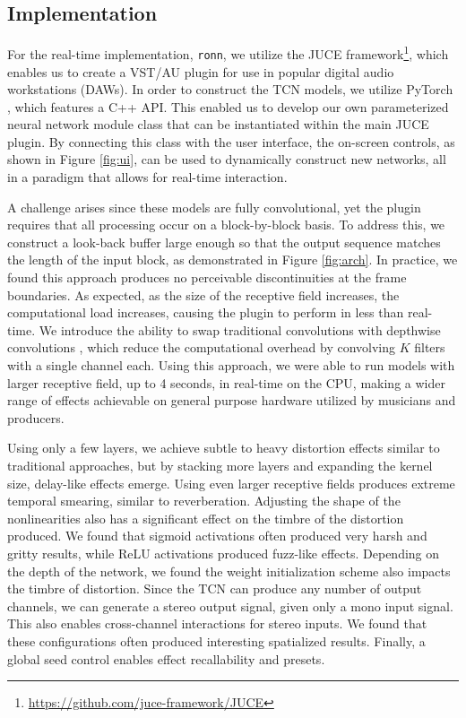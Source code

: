 \documentclass{article}
\begin{document}
\subsection{Implementation}
For the real-time implementation, \texttt{ronn}, we utilize the JUCE framework\footnote{\url{https://github.com/juce-framework/JUCE}},
which enables us to create a VST/AU plugin for use in popular digital audio workstations (DAWs).
In order to construct the TCN models, we utilize PyTorch \cite{pytorch}, which features a C++ API. 
This enabled us to develop our own parameterized neural network module class that can be instantiated within the main JUCE plugin.
By connecting this class with the user interface, the on-screen controls, as shown in Figure \ref{fig:ui},
can be used to dynamically construct new networks, all in a paradigm that allows for real-time interaction. 

A challenge arises since these models are fully convolutional,
yet the plugin requires that all processing occur on a block-by-block basis. 
To address this, we construct a look-back buffer large enough so that the output sequence matches the length of the input block, 
as demonstrated in Figure \ref{fig:arch}. 
In practice, we found this approach produces no perceivable discontinuities at the frame boundaries. 
As expected, as the size of the receptive field increases, the computational load increases, causing the plugin to perform in less than real-time.
We introduce the ability to swap traditional convolutions with depthwise convolutions \cite{howard2017mobilenets},
which reduce the computational overhead by convolving $K$ filters with a single channel each. 
Using this approach, we were able to run models with larger receptive field, up to 4 seconds, in real-time on the CPU,
making a wider range of effects achievable on general purpose hardware utilized by musicians and producers. 

Using only a few layers, we achieve subtle to heavy distortion effects similar to traditional approaches, 
but by stacking more layers and expanding the kernel size, delay-like effects emerge. 
Using even larger receptive fields produces extreme temporal smearing, similar to reverberation.
Adjusting the shape of the nonlinearities also has a significant effect on the timbre of the distortion produced. 
We found that sigmoid activations often produced very harsh and gritty results, while ReLU activations \cite{nair2010rectified} produced fuzz-like effects.
Depending on the depth of the network, we found the weight initialization scheme also impacts the timbre of distortion. 
Since the TCN can produce any number of output channels, we can generate a stereo output signal, given only a mono input signal.
This also enables cross-channel interactions for stereo inputs. We found that these configurations often produced interesting spatialized results. 
Finally, a global seed control enables effect recallability and presets.
\end{document}
